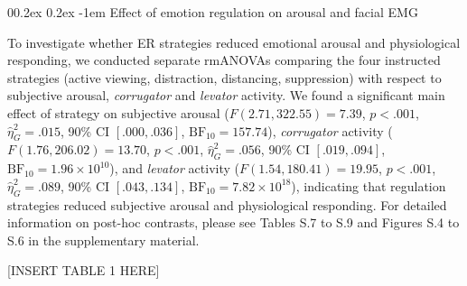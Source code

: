 \documentclass[
  man,floatsintext]{apa6}
\makeatletter
\let\oldparagraph\paragraph
\renewcommand{\paragraph}[1]{\oldparagraph{#1}\mbox{}}
\renewcommand{\paragraph}{\@startsection{paragraph}{4}{\parindent}%
  {0\baselineskip \@plus 0.2ex \@minus 0.2ex}%
  {-1em}%
  {\normalfont\normalsize\bfseries\itshape\typesectitle}}
\makeatother
\begin{document}
\hypertarget{effect-of-emotion-regulation-on-arousal-and-facial-emg}{%
\paragraph{Effect of emotion regulation on arousal and facial EMG}\label{effect-of-emotion-regulation-on-arousal-and-facial-emg}}

To investigate whether ER strategies reduced emotional arousal and physiological responding, we conducted separate rmANOVAs comparing the four instructed strategies (active viewing, distraction, distancing, suppression) with respect to subjective arousal, \emph{corrugator} and \emph{levator} activity.
We found a significant main effect of strategy on subjective arousal (\(F(2.71, 322.55) = 7.39\), \(p < .001\), \(\hat{\eta}^2_G = .015\), 90\% CI \([.000, .036]\), \(\mathrm{BF}_{\textrm{10}} = 157.74\)), \emph{corrugator} activity (\(F(1.76, 206.02) = 13.70\), \(p < .001\), \(\hat{\eta}^2_G = .056\), 90\% CI \([.019, .094]\), \(\mathrm{BF}_{\textrm{10}} = 1.96 \times 10^{10}\)), and \emph{levator} activity (\(F(1.54, 180.41) = 19.95\), \(p < .001\), \(\hat{\eta}^2_G = .089\), 90\% CI \([.043, .134]\), \(\mathrm{BF}_{\textrm{10}} = 7.82 \times 10^{18}\)), indicating that regulation strategies reduced subjective arousal and physiological responding.
For detailed information on post-hoc contrasts, please see Tables S.7 to S.9 and Figures S.4 to S.6 in the supplementary material.

{[}INSERT TABLE 1 HERE{]}
\end{document}
